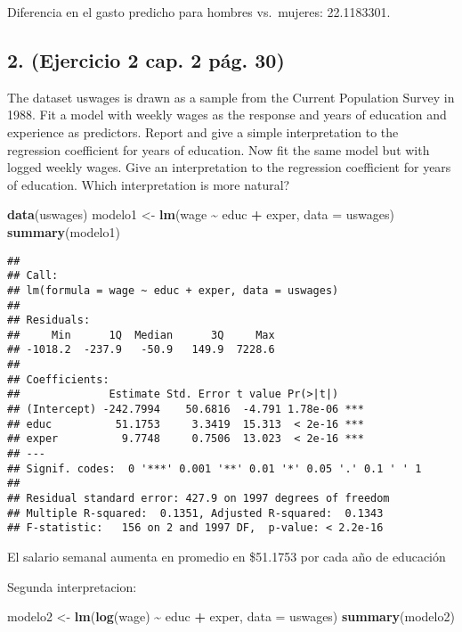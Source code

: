 \documentclass[
]{article}
\newenvironment{Shaded}{\begin{snugshade}}{\end{snugshade}}
\newcommand{\AttributeTok}[1]{\textcolor[rgb]{0.13,0.29,0.53}{#1}}
\newcommand{\FunctionTok}[1]{\textcolor[rgb]{0.13,0.29,0.53}{\textbf{#1}}}
\newcommand{\NormalTok}[1]{#1}
\newcommand{\OtherTok}[1]{\textcolor[rgb]{0.56,0.35,0.01}{#1}}
\newcommand{\SpecialCharTok}[1]{\textcolor[rgb]{0.81,0.36,0.00}{\textbf{#1}}}
\begin{document}
Diferencia en el gasto predicho para hombres vs.~mujeres: 22.1183301.

\hypertarget{ejercicio-2-cap.-2-puxe1g.-30}{%
\subsection{2. (Ejercicio 2 cap. 2 pág.
30)}\label{ejercicio-2-cap.-2-puxe1g.-30}}

The dataset uswages is drawn as a sample from the Current Population
Survey in 1988. Fit a model with weekly wages as the response and years
of education and experience as predictors. Report and give a simple
interpretation to the regression coefficient for years of education. Now
fit the same model but with logged weekly wages. Give an interpretation
to the regression coefficient for years of education. Which
interpretation is more natural?

\begin{Shaded}
\begin{Highlighting}[]
\FunctionTok{data}\NormalTok{(uswages)}
\NormalTok{modelo1 }\OtherTok{\textless{}{-}} \FunctionTok{lm}\NormalTok{(wage }\SpecialCharTok{\textasciitilde{}}\NormalTok{ educ }\SpecialCharTok{+}\NormalTok{ exper, }\AttributeTok{data =}\NormalTok{ uswages)}
\FunctionTok{summary}\NormalTok{(modelo1)}
\end{Highlighting}
\end{Shaded}

\begin{verbatim}
## 
## Call:
## lm(formula = wage ~ educ + exper, data = uswages)
## 
## Residuals:
##     Min      1Q  Median      3Q     Max 
## -1018.2  -237.9   -50.9   149.9  7228.6 
## 
## Coefficients:
##              Estimate Std. Error t value Pr(>|t|)    
## (Intercept) -242.7994    50.6816  -4.791 1.78e-06 ***
## educ          51.1753     3.3419  15.313  < 2e-16 ***
## exper          9.7748     0.7506  13.023  < 2e-16 ***
## ---
## Signif. codes:  0 '***' 0.001 '**' 0.01 '*' 0.05 '.' 0.1 ' ' 1
## 
## Residual standard error: 427.9 on 1997 degrees of freedom
## Multiple R-squared:  0.1351, Adjusted R-squared:  0.1343 
## F-statistic:   156 on 2 and 1997 DF,  p-value: < 2.2e-16
\end{verbatim}

El salario semanal aumenta en promedio en \$51.1753 por cada año de
educación

Segunda interpretacion:

\begin{Shaded}
\begin{Highlighting}[]
\NormalTok{modelo2 }\OtherTok{\textless{}{-}} \FunctionTok{lm}\NormalTok{(}\FunctionTok{log}\NormalTok{(wage) }\SpecialCharTok{\textasciitilde{}}\NormalTok{ educ }\SpecialCharTok{+}\NormalTok{ exper, }\AttributeTok{data =}\NormalTok{ uswages)}
\FunctionTok{summary}\NormalTok{(modelo2)}
\end{Highlighting}
\end{Shaded}
\end{document}
